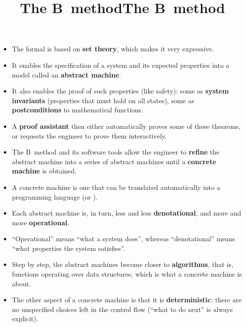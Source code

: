 \documentclass[wide]{slides}
\begin{document}
\begin{slide}
  \title{The B~method}

  \begin{itemize}

    \item The formal \textbf{\Blang} is based on \textbf{set theory},
      which makes it very expressive.

    \item It enables the specification of a system and its expected
      properties into a model called an \textbf{abstract machine}.

    \item It also enables the proof of such properties (like safety):
      some as \textbf{system invariants} (properties that must hold on
      all states), some as \textbf{postconditions} to mathematical
      functions.

    \item A \textbf{proof assistant} then either automatically proves
      some of these theorems, or requests the engineer to prove them
      interactively.

    \item The B~method and its software tools allow the engineer to
      \textbf{refine} the abstract machine into a series of abstract
      machines until a \textbf{concrete machine} is obtained.

    \item A concrete machine is one that can be translated
      automatically into a programming language (\Clang or \Ada).

  \end{itemize}

\end{slide}

\begin{slide}
  \title{The B~method}

  \begin{itemize}

    \item Each abstract machine is, in turn, less and less
      \textbf{denotational}, and more and more \textbf{operational}.

    \item ``Operational'' means ``what a system does'', whereas
      ``denotational'' means ``what properties the system satisfies''.

    \item Step by step, the abstract machines become closer to
      \textbf{algorithms}, that is, functions operating over data
      structures, which is what a concrete machine is about.

    \item The other aspect of a concrete machine is that it is
      \textbf{deterministic}: there are no unspecified choices left in
      the control flow (``what to do next'' is always explicit).

  \end{itemize}

\end{slide}
\end{document}
